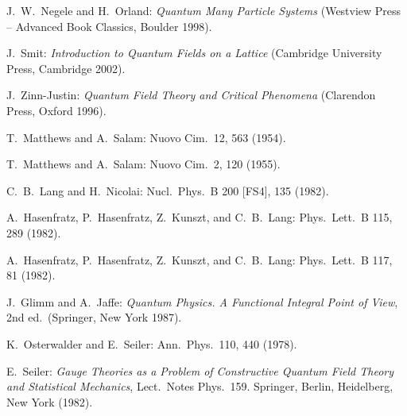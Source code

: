 \begin{enumerate}[label={[\arabic*]}]
  \item J.~W.~Negele and H.~Orland: \emph{Quantum Many Particle Systems}
        (Westview Press -- Advanced Book Classics, Boulder 1998).
  \item J.~Smit: \emph{Introduction to Quantum Fields on a Lattice} (Cambridge
        University Press, Cambridge 2002).
  \item J.~Zinn-Justin: \emph{Quantum Field Theory and Critical Phenomena}
        (Clarendon Press, Oxford 1996).
  \item T.~Matthews and A.~Salam: Nuovo Cim.\ 12, 563 (1954).
  \item T.~Matthews and A.~Salam: Nuovo Cim.\ 2, 120 (1955).
  \item C.~B.~Lang and H.~Nicolai: Nucl.\ Phys.\ B 200 [FS4], 135 (1982).
  \item A.~Hasenfratz, P.~Hasenfratz, Z.~Kunszt, and C.~B.~Lang: Phys.\ Lett.\
        B 115, 289 (1982).
  \item A.~Hasenfratz, P.~Hasenfratz, Z.~Kunszt, and C.~B.~Lang: Phys.\ Lett.\
        B 117, 81 (1982).
  \item J.~Glimm and A.~Jaffe: \emph{Quantum Physics. A Functional Integral
        Point of View}, 2nd ed.\ (Springer, New York 1987).
  \item K.~Osterwalder and E.~Seiler: Ann.\ Phys.\ 110, 440 (1978).
  \item E.~Seiler: \emph{Gauge Theories as a Problem of Constructive Quantum
        Field Theory and Statistical Mechanics}, Lect.\ Notes Phys.\ 159.
        Springer, Berlin, Heidelberg, New York (1982).
\end{enumerate}
